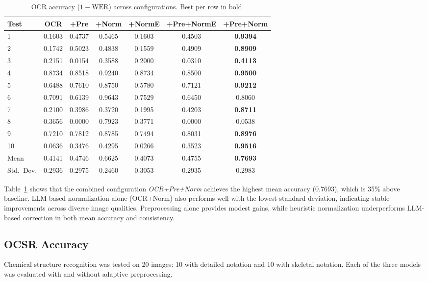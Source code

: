 \documentclass[conference]{IEEEtran}
\begin{document}
\begin{table}[t]
\centering
\small
\caption{OCR accuracy ($1 - \text{WER}$) across configurations. Best per row in bold.}
\label{tab:ocr}
\begin{tabular}{lcccccc}
\toprule
Test & OCR & +Pre & +Norm & +NormE & +Pre+NormE & \textbf{+Pre+Norm} \\
\midrule
1 & 0.1603 & 0.4737 & 0.5465 & 0.1603 & 0.4503 & \textbf{0.9394} \\
2 & 0.1742 & 0.5023 & 0.4838 & 0.1559 & 0.4909 & \textbf{0.8909} \\
3 & 0.2151 & 0.0154 & 0.3588 & 0.2000 & 0.0310 & \textbf{0.4113} \\
4 & 0.8734 & 0.8518 & 0.9240 & 0.8734 & 0.8500 & \textbf{0.9500} \\
5 & 0.6488 & 0.7610 & 0.8750 & 0.5780 & 0.7121 & \textbf{0.9212} \\
6 & 0.7091 & 0.6139 & 0.9643 & 0.7529 & 0.6450 & 0.8060 \\
7 & 0.2100 & 0.3986 & 0.3720 & 0.1995 & 0.4203 & \textbf{0.8711} \\
8 & 0.3656 & 0.0000 & 0.7923 & 0.3771 & 0.0000 & 0.0538 \\
9 & 0.7210 & 0.7812 & 0.8785 & 0.7494 & 0.8031 & \textbf{0.8976} \\
10 & 0.0636 & 0.3476 & 0.4295 & 0.0266 & 0.3523 & \textbf{0.9516} \\
\midrule
Mean & 0.4141 & 0.4746 & 0.6625 & 0.4073 & 0.4755 & \textbf{0.7693} \\
Std.~Dev. & 0.2936 & 0.2975 & 0.2460 & 0.3053 & 0.2935 & 0.2983 \\
\bottomrule
\end{tabular}
\end{table}

Table~\ref{tab:ocr} shows that the combined configuration \textit{OCR+Pre+Norm} achieves the highest mean accuracy (0.7693), which is 35\% above baseline. LLM-based normalization alone (OCR+Norm) also performs well with the lowest standard deviation, indicating stable improvements across diverse image qualities. Preprocessing alone provides modest gains, while heuristic normalization underperforms LLM-based correction in both mean accuracy and consistency.

\subsection{OCSR Accuracy}

Chemical structure recognition was tested on 20 images: 10 with detailed notation and 10 with skeletal notation. Each of the three models was evaluated with and without adaptive preprocessing.
\end{document}
